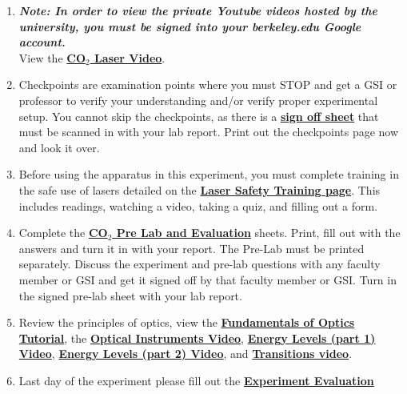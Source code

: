 \documentclass{../lab}
\begin{document}
\begin{enumerate}
    \item \emph{\textbf{Note: In order to view the private Youtube videos hosted by the university, you must be signed into your berkeley.edu Google account.}} \\
    View the \href{http://youtu.be/-cLSnuXGC\_U}{\textbf{CO$_2$ Laser Video}}.

    \item Checkpoints are examination points where you must STOP and get a GSI or professor to verify your understanding and/or verify proper experimental setup. You cannot skip the checkpoints, as there is a \href{http://experimentationlab.berkeley.edu/node/137}{\textbf{sign off sheet}} that must be scanned in with your lab report. Print out the checkpoints page now and look it over.

    \item Before using the apparatus in this experiment, you must complete training in the safe use of lasers detailed on the \href{http://experimentationlab.berkeley.edu/lasersafety}{\textbf{\textbf{Laser Safety Training page}}}. This includes readings, watching a video, taking a quiz, and filling out a form.

    \item Complete the \href{http://experimentationlab.berkeley.edu/CO2prelab}{\textbf{\textbf{CO$_2$ Pre Lab and Evaluation}}} sheets. Print,  fill out with the answers and turn it in with your report. The Pre-Lab must be printed separately. Discuss the experiment and pre-lab questions with any faculty member or GSI and get it signed off by that faculty member or GSI. Turn in the signed pre-lab sheet with your lab report.

    \item Review the principles of optics, view the \href{http://experimentationlab.berkeley.edu/sites/default/files/QIE/fundamental-Optics.pdf}{\textbf{Fundamentals of Optics Tutorial}}, the \href{http://youtu.be/zUGBt5vc5FA}{\textbf{Optical Instruments Video}}, \href{http://youtu.be/wyBOVjU5bBQ}{\textbf{Energy Levels (part 1) Video}}, \href{http://youtu.be/Eypw0DmVBxk}{\textbf{Energy Levels (part 2) Video}}, and \href{http://youtu.be/xOMgdVP3AfE}{\textbf{Transitions video}}.

    \item Last day of the experiment please fill out the \href{\ExperimentEvaluation}{\textbf{Experiment Evaluation}}

\end{enumerate}
\end{document}
